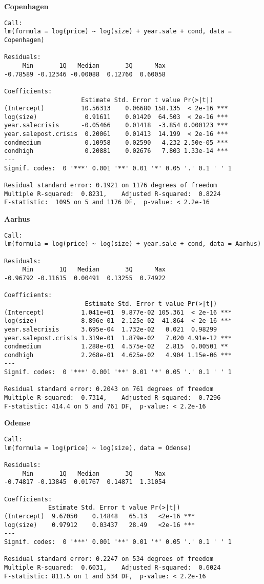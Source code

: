 \textbf{Copenhagen} \\
\begin{lstlisting}
Call:
lm(formula = log(price) ~ log(size) + year.sale + cond, data = Copenhagen)

Residuals:
     Min       1Q   Median       3Q      Max 
-0.78589 -0.12346 -0.00088  0.12760  0.60058 

Coefficients:
                     Estimate Std. Error t value Pr(>|t|)    
(Intercept)          10.56313    0.06680 158.135  < 2e-16 ***
log(size)             0.91611    0.01420  64.503  < 2e-16 ***
year.salecrisis      -0.05466    0.01418  -3.854 0.000123 ***
year.salepost.crisis  0.20061    0.01413  14.199  < 2e-16 ***
condmedium            0.10958    0.02590   4.232 2.50e-05 ***
condhigh              0.20881    0.02676   7.803 1.33e-14 ***
---
Signif. codes:  0 '***' 0.001 '**' 0.01 '*' 0.05 '.' 0.1 ' ' 1

Residual standard error: 0.1921 on 1176 degrees of freedom
Multiple R-squared:  0.8231,	Adjusted R-squared:  0.8224 
F-statistic:  1095 on 5 and 1176 DF,  p-value: < 2.2e-16
\end{lstlisting}

\textbf{Aarhus}
\begin{lstlisting}
Call:
lm(formula = log(price) ~ log(size) + year.sale + cond, data = Aarhus)

Residuals:
     Min       1Q   Median       3Q      Max 
-0.96792 -0.11615  0.00491  0.13255  0.74922 

Coefficients:
                      Estimate Std. Error t value Pr(>|t|)    
(Intercept)          1.041e+01  9.877e-02 105.361  < 2e-16 ***
log(size)            8.896e-01  2.125e-02  41.864  < 2e-16 ***
year.salecrisis      3.695e-04  1.732e-02   0.021  0.98299    
year.salepost.crisis 1.319e-01  1.879e-02   7.020 4.91e-12 ***
condmedium           1.288e-01  4.575e-02   2.815  0.00501 ** 
condhigh             2.268e-01  4.625e-02   4.904 1.15e-06 ***
---
Signif. codes:  0 '***' 0.001 '**' 0.01 '*' 0.05 '.' 0.1 ' ' 1

Residual standard error: 0.2043 on 761 degrees of freedom
Multiple R-squared:  0.7314,	Adjusted R-squared:  0.7296 
F-statistic: 414.4 on 5 and 761 DF,  p-value: < 2.2e-16
\end{lstlisting}

\textbf{Odense}
\begin{lstlisting}
Call:
lm(formula = log(price) ~ log(size), data = Odense)

Residuals:
     Min       1Q   Median       3Q      Max 
-0.74817 -0.13845  0.01767  0.14871  1.31054 

Coefficients:
            Estimate Std. Error t value Pr(>|t|)    
(Intercept)  9.67050    0.14848   65.13   <2e-16 ***
log(size)    0.97912    0.03437   28.49   <2e-16 ***
---
Signif. codes:  0 '***' 0.001 '**' 0.01 '*' 0.05 '.' 0.1 ' ' 1

Residual standard error: 0.2247 on 534 degrees of freedom
Multiple R-squared:  0.6031,	Adjusted R-squared:  0.6024 
F-statistic: 811.5 on 1 and 534 DF,  p-value: < 2.2e-16
\end{lstlisting}

